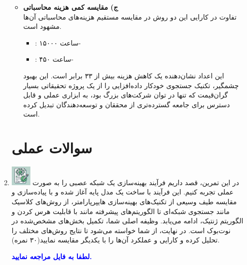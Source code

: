 \documentclass[12pt]{article}
\begin{document}
\begin{enumerate}
{\begin{itemize}
\begin{itemize}
            \end{itemize}
            این استراتژی، گلوگاه محاسباتی  اصلی را از بین می‌برد، زیرا دیگر نیازی نیست که به ازای هر سیاست کاندید، یک مدل از ابتدا تا انتها آموزش داده شود.
            \item \textbf{ج) مقایسه کمی هزینه محاسباتی}\\  
            تفاوت در کارایی این دو روش در مقایسه مستقیم هزینه‌های محاسباتی آن‌ها مشهود است.  
            \begin{itemize}
                \item {}: ۱۵۰۰۰ ساعت-  
                \item {}: ۴۵۰ ساعت-  
            \end{itemize}
            این اعداد نشان‌دهنده یک کاهش هزینه بیش از ۳۳ برابر است. این بهبود چشمگیر، تکنیک جستجوی خودکار داده‌افزایی را از یک پروژه تحقیقاتی بسیار گران‌قیمت که تنها در توان شرکت‌های بزرگ بود، به ابزاری عملی و قابل دسترس برای جامعه گسترده‌تری از محققان و توسعه‌دهندگان تبدیل کرده است.
        \end{itemize}
    }


   
    
    \section*{سوالات عملی} 
    \item \includegraphics[width=1cm]{figs/Allowed_with_contributino.jpg}
    در این تمرین، قصد داریم فرآیند بهینه‌سازی یک شبکه عصبی را به صورت عملی تجربه کنیم. این فرآیند با ساخت یک مدل پایه  آغاز شده و با پیاده‌سازی و مقایسه طیف وسیعی از تکنیک‌های بهینه‌سازی هایپرپارامتر، از روش‌های کلاسیک مانند جستجوی شبکه‌ای تا الگوریتم‌های پیشرفته مانند  با قابلیت هرس کردن و الگوریتم ژنتیک، ادامه می‌یابد.
    وظیفه اصلی شما، تکمیل بخش‌های مشخص‌شده در نوت‌بوک  است. در نهایت، از شما خواسته می‌شود تا نتایج روش‌های مختلف را تحلیل کرده و کارایی و عملکرد آن‌ها را با یکدیگر مقایسه نمایید(۳۰ نمره).

    \textcolor{blue}{\textbf{لطفا به فایل  مراجعه نمایید.}}




    
 
\end{enumerate}
\end{document}
